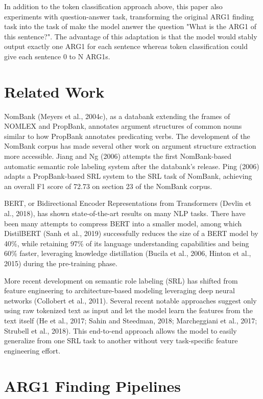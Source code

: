 \documentclass[11pt]{article}
\begin{document}
In addition to the token classification approach above, this paper also experiments with question-answer task, transforming the original ARG1 finding task into the task of make the model answer the question "What is the ARG1 of this sentence?". The advantage of this adaptation is that the model would stably output exactly one ARG1 for each sentence whereas token classification could give each sentence 0 to N ARG1s.


\section{Related Work}

NomBank (Meyers et al., 2004c), as a databank extending the frames of NOMLEX and PropBank, annotates argument structures of common nouns similar to how PropBank annotates predicating verbs. The development of the NomBank corpus has made several other work on argument structure extraction more accessible. Jiang and Ng (2006) attempts the first NomBank-based automatic semantic role labeling system after the databank's release. Ping (2006)  adapts a PropBank-based SRL system to the SRL task of NomBank, achieving an overall F1 score of 72.73 on section 23 of the NomBank corpus.

BERT, or Bidirectional Encoder Representations from Transformers (Devlin et al., 2018), has shown state-of-the-art results on many NLP tasks. There have been many attempts to compress BERT into a smaller model, among which DistilBERT (Sanh et al., 2019) successfully reduces the size of a BERT model by 40\%, while retaining 97\% of its language understanding capabilities and being 60\% faster, leveraging  knowledge distillation (Bucila et al., 2006, Hinton et al., 2015) during the pre-training phase.

More recent development on semantic role labeling (SRL) has shifted from feature engineering to architecture-based modeling leveraging deep neural networks (Collobert
et al., 2011). Several recent notable approaches suggest only using raw tokenized text as input and let the model learn the features from the text itself (He et al., 2017; Sahin and Steedman, 2018; Marcheggiani et al., 2017; Strubell et al., 2018). This end-to-end approach allows the model to easily generalize from one SRL task to another without very task-specific feature engineering effort.

\section{ARG1 Finding Pipelines}
\end{document}
